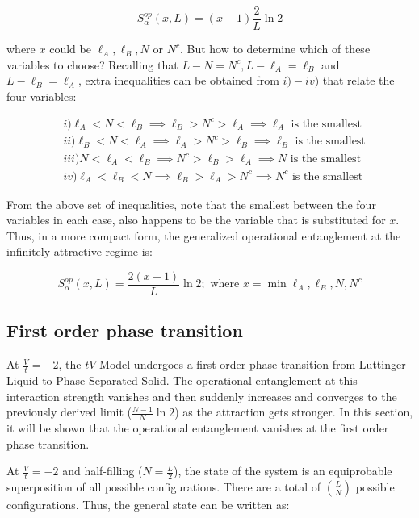\begin{equation}
S_\alpha^{op}(x,L) = (x - 1) \frac{2}{L} \ln{2}
\end{equation}

where $x$ could be  $\ell_A, \ell_B, N$ or $N^c$. But how to determine which of these variables to choose? Recalling that $L-N = N^c, L-\ell_A = \ell_B$ and $L-\ell_B = \ell_A$, extra inequalities can be obtained from $i)-iv)$ that relate the four variables:

\begin{align}
& i) \ell_{A} < N < \ell_{B} \implies \ell_{B} > N^c > \ell_{A} \implies \ell_{A} \text{ is the smallest} \nonumber \\
& ii) \ell_{B} < N < \ell_{A} \implies \ell_{A} > N^c > \ell_{B} \implies \ell_{B} \text{ is the smallest} \nonumber \\
& iii)  N < \ell_{A} < \ell_{B} \implies N^c > \ell_{B} > \ell_{A} \implies N \text{ is the smallest} \nonumber \\
& iv) \ell_{A} < \ell_{B} < N \implies \ell_{B} > \ell_{A} > N^c \implies N^c \text{ is the smallest} \nonumber 
\end{align}

From the above set of inequalities, note that the smallest between the four variables in each case, also happens to be the variable that is substituted for $x$. Thus, in a more compact form, the generalized operational entanglement at the infinitely attractive regime is:

\begin{equation}
S_\alpha^{op}(x,L) = \frac{2(x-1)}{L} \ln{2} ; \text{ where } x = \min{\ell_A, \ell_B, N, N^c}
\end{equation}

	\subsection{First order phase transition}
	
At $\frac{V}{t} = -2$, the $tV$-Model undergoes a first order phase transition from Luttinger Liquid to Phase Separated Solid. The operational entanglement at this interaction strength vanishes and then suddenly increases and converges to the previously derived limit ($\frac{N-1}{N}\ln{2}$) as the attraction gets stronger. In this section, it will be shown that the operational entanglement vanishes at the first order phase transition.

At $\frac{V}{t}=-2$ and half-filling ($N=\frac{L}{2}$), the state of the system is an equiprobable superposition of all possible configurations. There are a total of ${L}\choose{N}$ possible configurations. Thus, the general state can be written as: 

